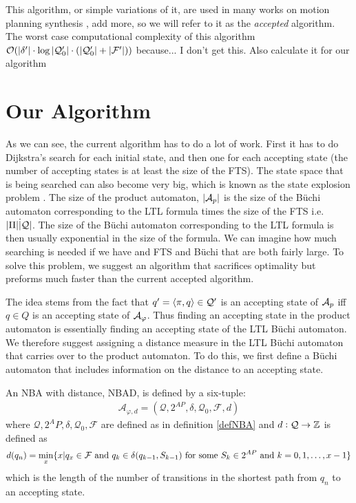 This algorithm, or simple variations of it, are used in many works on motion planning synthesis \cite{fainekos09}, add more, so we will refer to it as the \textit{accepted} algorithm. The worst case computational complexity of this algorithm $\mathcal{O}(|\delta'| \cdot \log|\mathcal{Q}_0'| \cdot (|\mathcal{Q}_0'| + |\mathcal{F}'|))$ because... I don't get this. Also calculate it for our algorithm

\newpage
\section{Our Algorithm}
As we can see, the current algorithm has to do a lot of work. First it has to do Dijkstra's search for each initial state, and then one for each accepting state (the number of accepting states is at least the size of the FTS). The state space that is being searched can also become very big, which is known as the state explosion problem \cite{clarke99}. The size of the product automaton, $|\mathcal{A}_p|$ is the size of the B\"{u}chi automaton corresponding to the LTL formula times the size of the FTS i.e.\ $|\Pi| \dot |\mathcal{Q}|$. The size of the B\"{u}chi automaton corresponding to the LTL formula is then usually exponential in the size of the formula. We can imagine how much searching is needed if we have and FTS and B\"{u}chi that are both fairly large. To solve this problem, we suggest an algorithm that sacrifices optimality but preforms much faster than the current accepted algorithm. 

The idea stems from the fact that $q' = \langle \pi, q \rangle \in \mathcal{Q}'$ is an accepting state of $\mathcal{A}_p$ iff $q \in Q$ is an accepting state of $\mathcal{A}_\varphi$. Thus finding an accepting state in the product automaton is essentially finding an accepting state of the LTL B\"{u}chi automaton. We therefore suggest assigning a distance measure in the LTL B\"{u}chi automaton that carries over to the product automaton. To do this, we first define a B\"{u}chi automaton that includes information on the distance to an accepting state.

\begin{definition}
\label{defBWD}
An NBA with distance, NBAD, is defined by a six-tuple:
\begin{align*}
\mathcal{A}_{\varphi,d} = (\mathcal{Q},2^{AP},\delta,\mathcal{Q}_0,\mathcal{F},d)
\end{align*}
where $\mathcal{Q},2^AP,\delta,\mathcal{Q}_0,\mathcal{F}$ are defined as in definition \ref{defNBA} and $d:\mathcal{Q} \rightarrow \mathbb{Z}$ is defined as 
\begin{align*}
d(q_n) = \min_x \{x | q_x \in \mathcal{F} \text{ and } q_k \in \delta(q_{k-1},S_{k-1}) \text{ for some } S_k \in 2^{AP} \text{ and } k = 0,1,\dots, x-1 \}
\end{align*}
which is the length of the number of transitions in the shortest path from $q_n$ to an accepting state.
\end{definition}

